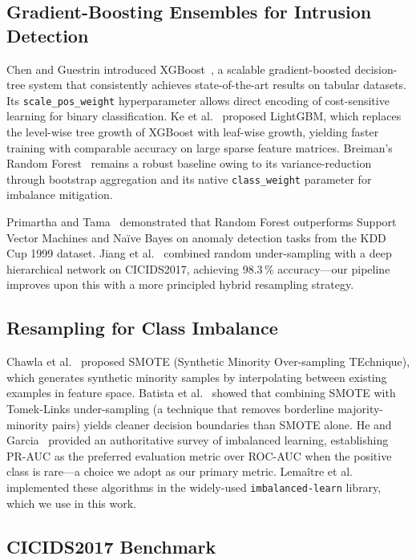 \documentclass[conference]{IEEEtran}
\begin{document}
\subsection{Gradient-Boosting Ensembles for Intrusion Detection}

Chen and Guestrin introduced XGBoost~\cite{chen2016xgboost}, a scalable
gradient-boosted decision-tree system that consistently achieves
state-of-the-art results on tabular datasets.  Its \texttt{scale\_pos\_weight}
hyperparameter allows direct encoding of cost-sensitive learning for
binary classification.  Ke et al.~\cite{ke2017lightgbm} proposed LightGBM,
which replaces the level-wise tree growth of XGBoost with leaf-wise growth,
yielding faster training with comparable accuracy on large sparse feature
matrices.  Breiman's Random Forest~\cite{breiman2001} remains a robust
baseline owing to its variance-reduction through bootstrap aggregation
and its native \texttt{class\_weight} parameter for imbalance mitigation.

Primartha and Tama~\cite{primartha2017} demonstrated that Random Forest
outperforms Support Vector Machines and Naïve Bayes on anomaly detection
tasks from the KDD Cup 1999 dataset.  Jiang et al.~\cite{jiang2020}
combined random under-sampling with a deep hierarchical network on
CICIDS2017, achieving 98.3\,\% accuracy—our pipeline improves upon
this with a more principled hybrid resampling strategy.

\subsection{Resampling for Class Imbalance}

Chawla et al.~\cite{chawla2002smote} proposed SMOTE (Synthetic Minority
Over-sampling TEchnique), which generates synthetic minority samples by
interpolating between existing examples in feature space.  Batista
et al.~\cite{batista2004} showed that combining SMOTE with Tomek-Links
under-sampling (a technique that removes borderline majority-minority
pairs) yields cleaner decision boundaries than SMOTE alone.
He and Garcia~\cite{he2009} provided an authoritative survey of
imbalanced learning, establishing PR-AUC as the preferred evaluation
metric over ROC-AUC when the positive class is rare—a choice we adopt
as our primary metric.  Lemaître et al.~\cite{lemaitre2017}
implemented these algorithms in the widely-used \texttt{imbalanced-learn}
library, which we use in this work.

\subsection{CICIDS2017 Benchmark}
\end{document}

